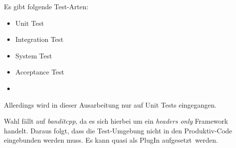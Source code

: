 


Es gibt folgende Test-Arten:
\begin{itemize}
\item Unit Test
\item Integration Test
\item System Test
\item Acceptance Test
\item {}
\end{itemize}


Allerdings wird in dieser Ausarbeitung nur auf Unit Tests eingegangen.








Wahl fällt auf \textit{banditcpp}, da es sich hierbei um ein \textit{headers only} Framework handelt.
Daraus folgt, dass die Test-Umgebung nicht in den Produktiv-Code eingebunden werden muss. Es kann quasi als PlugIn \glqq aufgesetzt\grqq\ werden.













